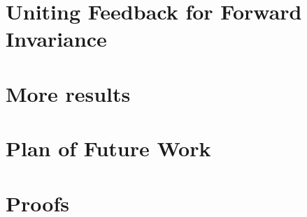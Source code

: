 \documentclass[11pt]{ucthesis}
\begin{document}
\chapter{Uniting Feedback for Forward Invariance} \label{sec:forward invariance}


\chapter{More results} \label{sec:FiniteTime}
% 

\chapter{Plan of Future Work} \label{sec:FutureWork}


\appendix

\chapter{Proofs} \label{sec:AppendixA}
% 

\nocite{goebel_hybrid_2012}
\printbibliography{}
\end{document}
